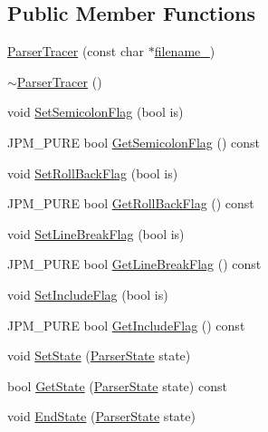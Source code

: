 \subsection*{Public Member Functions}
\begin{DoxyCompactItemize}
\item 
\hyperlink{classmocha_1_1_parser_tracer_a1275e0408a44f429533372ecd559da14}{ParserTracer} (const char $\ast$\hyperlink{classmocha_1_1_parser_tracer_ae45e8a1683a3ac121218fdad7b6b9bc2}{filename\_\-})
\item 
\hyperlink{classmocha_1_1_parser_tracer_a6ddfb9f4b58e5eef20c46461cb9f5c87}{$\sim$ParserTracer} ()
\item 
void \hyperlink{classmocha_1_1_parser_tracer_a1374dd1660c2300fb050595114d52595}{SetSemicolonFlag} (bool is)
\item 
JPM\_\-PURE bool \hyperlink{classmocha_1_1_parser_tracer_af4a281bd4efe1ee704e5ef0a91c31564}{GetSemicolonFlag} () const 
\item 
void \hyperlink{classmocha_1_1_parser_tracer_a5ce38127b141a5213add4ee4e556cc42}{SetRollBackFlag} (bool is)
\item 
JPM\_\-PURE bool \hyperlink{classmocha_1_1_parser_tracer_a26a38983c66404db2666052aa02a8d8d}{GetRollBackFlag} () const 
\item 
void \hyperlink{classmocha_1_1_parser_tracer_a8e2ca7195200965dce3f5d82d15b322b}{SetLineBreakFlag} (bool is)
\item 
JPM\_\-PURE bool \hyperlink{classmocha_1_1_parser_tracer_a143df5acd7b28790cde70a5744660c94}{GetLineBreakFlag} () const 
\item 
void \hyperlink{classmocha_1_1_parser_tracer_ab1a1497fdd0d9bee7b5cb190ccfd57e8}{SetIncludeFlag} (bool is)
\item 
JPM\_\-PURE bool \hyperlink{classmocha_1_1_parser_tracer_a33f348823e64116a9ebbb25654a1ae09}{GetIncludeFlag} () const 
\item 
void \hyperlink{classmocha_1_1_parser_tracer_aeb18997de46f8084f6b5c0308f79199f}{SetState} (\hyperlink{classmocha_1_1_parser_tracer_afe3c94bff7f4cd17fd2f457f92fcf713}{ParserState} state)
\item 
bool \hyperlink{classmocha_1_1_parser_tracer_a99cf8da56dede369d5dbe70f3ecef3a2}{GetState} (\hyperlink{classmocha_1_1_parser_tracer_afe3c94bff7f4cd17fd2f457f92fcf713}{ParserState} state) const 
\item 
void \hyperlink{classmocha_1_1_parser_tracer_a2a0da04ecd0abb0bc7bfcf3567a91580}{EndState} (\hyperlink{classmocha_1_1_parser_tracer_afe3c94bff7f4cd17fd2f457f92fcf713}{ParserState} state)

\end{DoxyCompactItemize}
